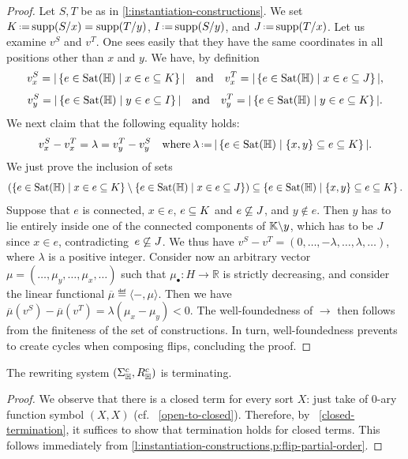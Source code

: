 \begin{proof}
Let $S,T$ be as in \cref{l:instantiation-constructions}. 
We set $K\eqdef \supp(\occ{S}{x})=\supp(\occ{T}{y})$, $I\eqdef \supp(\occ{S}{y})$, and $J\eqdef \supp(\occ{T}{x})$.
Let us examine $v^S$ and $v^T$. 
One sees easily that they have the same coordinates in all positions other than $x$ and $y$. 
We have, by definition
$$ v^S_x  = |\left\{e\in{\mathrm{Sat}}({\mathbb H}) \mid x\in e\subseteq K\right\}| \quad \text{and} \quad v^T_x  = |\left\{e\in{\mathrm{Sat}}({\mathbb H}) \mid x\in e\subseteq J\right\}|, $$
$$ v^S_y  = |\left\{e\in{\mathrm{Sat}}({\mathbb H}) \mid y\in e\subseteq I\right\}| \quad \text{and} \quad v^T_y  = |\left\{e\in{\mathrm{Sat}}({\mathbb H}) \mid y\in e\subseteq K\right\}|.$$
We next claim that the following equality holds:
$$v^S_x  - v^T_x  = \lambda = 
v^T_y - v^S_y \quad\textrm{where}\: \lambda\eqdef  |\setc{e\in{\Sat}(\hyper{H})}{\set{x,y}\inc e\inc K}|.$$
We just prove the inclusion of sets
$$\left(\left\{e\in{\mathrm{Sat}}({\mathbb H}) \mid x\in e\subseteq K\right\}\setminus\left\{e\in{\mathrm{Sat}}({\mathbb H}) \mid x\in e\subseteq J\right\}\right)
\subseteq\left\{e\in{\mathrm{Sat}}({\mathbb H}) \mid \left\{x,y\right\}\subseteq e\subseteq K\right\}.$$
Suppose that $e$ is connected, $x\in e$, $e\subseteq K$ and $e\not\subseteq J$, and $y\not\in e$. Then $y$ has to lie entirely inside one of the connected components of ${\mathbb K}\backslash y$, which has to be $J$ since $x\in e$, contradicting~$e\not\subseteq J$.
We thus have
$v^S - v^T = (0,\ldots,-\lambda,\ldots,\lambda,\ldots)$, where $\lambda$ is a positive integer.
Consider now an arbitrary vector $\mu=(\ldots,\mu_y,\ldots,\mu_x,\ldots)$ such that $\mu_{\bullet}:H\rightarrow\mathbb{R}$ is strictly decreasing, and consider the linear functional $\overline{\mu}\eqdef \langle -,\mu\rangle$. 
Then we have 
$\overline{\mu}(v^S)- \overline{\mu}(v^T)=\lambda(\mu_x-\mu_y)<0$.  The well-foundedness of $\to$ then follows from the finiteness of the set of constructions. In turn, well-foundedness 
prevents to create cycles when composing flips, concluding the proof.
\end{proof}

\begin{theorem}
  \label{thm:termination}
  The rewriting system $(\Sigma_{\mathbb H}^c,R_{\mathbb H}^c)$ is terminating.
\end{theorem}

\begin{proof} 
  We observe that there is a closed term for every sort $X$: just take of 0-ary function symbol $(X,X)$ (cf.~ \cref{open-to-closed}). 
  Therefore, by~ \cref{closed-termination}, it suffices to show that termination holds for closed terms. 
  This follows immediately from \cref{l:instantiation-constructions,p:flip-partial-order}.
\end{proof}

